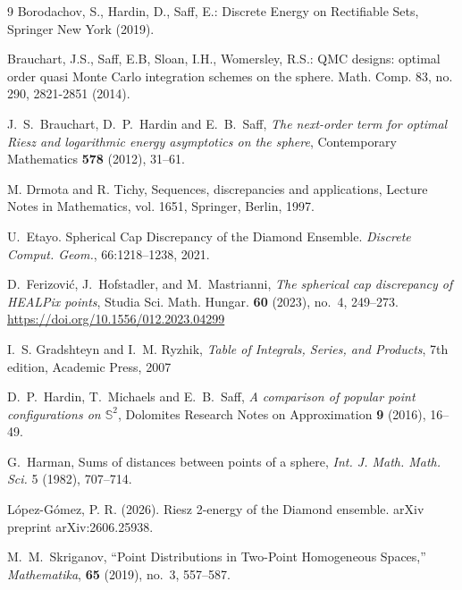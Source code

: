\documentclass[11pt]{amsart}
\begin{document}
\begin{thebibliography}{9}
 Borodachov, S., Hardin, D., Saff, E.: Discrete Energy on Rectifiable Sets, Springer New York (2019).

Brauchart, J.S., Saff, E.B, Sloan, I.H., Womersley, R.S.: QMC designs:
optimal order quasi Monte Carlo integration schemes on the sphere. Math. Comp.
83, no. 290, 2821-2851 (2014).

J.~S.~Brauchart, D.~P.~Hardin and E.~B.~Saff,
\emph{The next-order term for optimal Riesz and logarithmic energy
asymptotics on the sphere}, Contemporary Mathematics \textbf{578} (2012),
31--61.

M. Drmota and R. Tichy, Sequences, discrepancies and applications, Lecture Notes in Mathematics, vol. 1651,
Springer, Berlin, 1997.

 U.~Etayo. Spherical Cap Discrepancy of the Diamond Ensemble. \emph{Discrete Comput. Geom.}, 66:1218--1238, 2021.


D.~Ferizovi\'c, J.~Hofstadler, and M.~Mastrianni,
\emph{The spherical cap discrepancy of HEALPix points},
Studia Sci. Math. Hungar. \textbf{60} (2023), no.~4, 249--273.
\url{https://doi.org/10.1556/012.2023.04299}

 I.~S. Gradshteyn and I.~M. Ryzhik, \emph{Table of Integrals, Series, and Products}, 7th edition, Academic Press, 2007

D.~P.~Hardin, T.~Michaels and E.~B.~Saff,
\emph{A comparison of popular point configurations on $\mathbb S^2$},
Dolomites Research Notes on Approximation \textbf{9} (2016), 16--49.

 G.~Harman, Sums of distances between points of a sphere, \emph{Int. J. Math. Math. Sci.} 5 (1982), 707--714.


López-Gómez, P. R. (2026). Riesz 2-energy of the Diamond ensemble. arXiv preprint arXiv:2606.25938.

 M.~M.~Skriganov, ``Point Distributions in Two-Point Homogeneous Spaces,'' \emph{Mathematika}, \textbf{65} (2019), no.~3, 557--587.


\end{thebibliography}
\end{document}
